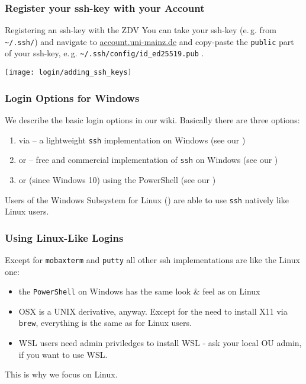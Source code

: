 \begin{frame}
	\frametitle{Register your ssh-key with your Account}
	\begin{exampleblock}{Registering an ssh-key with the ZDV}
		You can take your ssh-key (e.\,g. from \texttt{\textasciitilde/.ssh/}) and navigate to \url{account.uni-mainz.de} and copy-paste the \texttt{public} part of your ssh-key, e.\,g. \texttt{\textasciitilde/.ssh/config/id\_ed25519.pub} .
	\end{exampleblock}
	\centering
	\texttt{[image: login/adding\_ssh\_keys]}
\end{frame}

\begin{frame}
	\frametitle{Login Options for Windows}
	We describe the basic login options in our wiki.\newline
	Basically there are three options:
	\begin{enumerate}
		\item via  -- a lightweight \texttt{ssh} implementation on Windows (see our )
		\item or  -- free and commercial implementation of \texttt{ssh} on Windows (see our )
		\item or (since Windows 10) using the PowerShell (see our )
	\end{enumerate}
	Users of the Windows Subsystem for Linux () are able to use \texttt{ssh} natively like Linux users.
	\vfill
\end{frame}

\begin{frame}
	\frametitle{Using Linux-Like Logins}
	\begin{docs}
		Except for \texttt{mobaxterm} and \texttt{putty} all other ssh implementations are like the Linux one:
		\begin{itemize}
			\item the \texttt{PowerShell} on Windows has the same look \& feel as on Linux
			\item OSX is a UNIX derivative, anyway. Except for the need to install X11 via \texttt{brew}, everything is the same as for Linux users.
			\item WSL users need admin priviledges to install WSL - ask your local OU admin, if you want to use WSL.
		\end{itemize}
	\end{docs}
	
	\pause
	\begin{hint}
		This is why we focus on Linux.
	\end{hint}
\end{frame}


